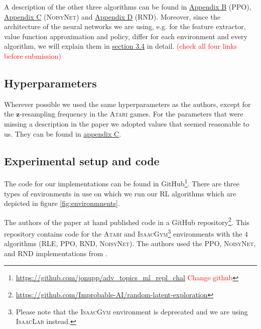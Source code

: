\documentclass[10pt]{article} %
\begin{document}
\noindent A description of the other three algorithms can be found in \hyperlink{algo-ppo}{Appendix B} (\textsc{PPO}), \hyperlink{algo-noisynet}{Appendix C} (\textsc{NoisyNet}) and \hyperlink{algo-rnd}{Appendix D} (\textsc{RND}). Moreover, since the architecture of the neural networks we are using, e.g. for the feature extractor, value function approximation and policy, differ for each environment and every algorithm, we will explain them in \hyperlink{experimental-setup}{section 3.4} in detail. \textcolor{red}{(check all four links before submission)}

\hypertarget{hyperparameter-subsection}{\subsection{Hyperparameters}}

Wherever possible we used the same hyperparameters as the authors, except for the $\textbf{z}$-resampling frequency in the \textsc{Atari} games. For the parameters that were missing a description in the paper we adopted values that seemed reasonable to us. They can be found in \hyperlink{appendix-hyperparams}{appendix C}.

\hypertarget{experimental-setup}{\subsection{Experimental setup and code}}

The code for our implementations can be found in GitHub\footnote{\href{https://github.com/jonupp/adv_topics_ml_repl_chal}{https://github.com/jonupp/adv\_topics\_ml\_repl\_chal} \textcolor{red}{Change github}}. There are three types of environments in use on which we run our RL algorithms which are depicted in figure \ref{fig:environmnents}. 

\noindent The authors of the paper at hand published code in a GitHub repository\footnote{\href{https://github.com/Improbable-AI/random-latent-exploration}{https://github.com/Improbable-AI/random-latent-exploration}}. This repository contains code for the \textsc{Atari} and \textsc{IsaacGym}\footnote{Please note that the \textsc{IsaacGym} environment is deprecated and we are using \textsc{IsaacLab} instead.} environments with the $4$ algorithms (\textsc{RLE}, \textsc{PPO}, \textsc{RND}, \textsc{NoisyNet}). The authors used the \textsc{PPO}, \textsc{NoisyNet}, and \textsc{RND} implementations from \cite{clearnrl-paper}.
\end{document}
